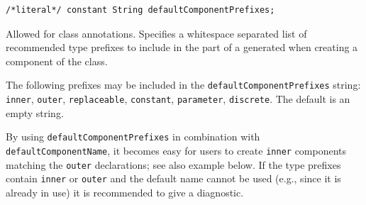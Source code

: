 \begin{annotationdefinition}[defaultComponentPrefixes]
\begin{synopsis}\begin{lstlisting}
/*literal*/ constant String defaultComponentPrefixes;
\end{lstlisting}\end{synopsis}
\begin{semantics}
Allowed for class annotations.
Specifies a whitespace separated list of recommended type prefixes to include in the  part of a  generated when creating a component of the class.

The following prefixes may be included in the \lstinline!defaultComponentPrefixes! string: \lstinline!inner!, \lstinline!outer!, \lstinline!replaceable!, \lstinline!constant!, \lstinline!parameter!, \lstinline!discrete!.
The default is an empty string.

\begin{nonnormative}
By using \lstinline!defaultComponentPrefixes! in combination with \lstinline!defaultComponentName!, it becomes easy for users to create \lstinline!inner! components matching the \lstinline!outer! declarations; see also example below.
If the type prefixes contain \lstinline!inner! or \lstinline!outer! and the default name cannot be used (e.g., since it is already in use) it is recommended to give a diagnostic.
\end{nonnormative}
\end{semantics}
\end{annotationdefinition}

